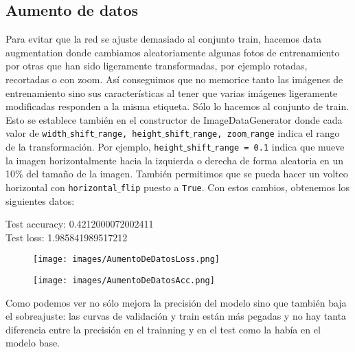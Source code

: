 \documentclass[12pt]{article}
\begin{document}
\subsection*{Aumento de datos}
Para evitar que la red se ajuste demasiado al conjunto train, hacemos data augmentation donde cambiamos aleatoriamente algunas fotos de entrenamiento por otras que han sido ligeramente transformadas, por ejemplo rotadas, recortadas o con zoom. Así conseguimos que no memorice tanto las imágenes de entrenamiento sino sus características al tener que varias imágenes ligeramente modificadas responden a la misma etiqueta. Sólo lo hacemos al conjunto de train. Esto se establece también en el constructor de ImageDataGenerator donde cada valor de \texttt{width$\_$shift$\_$range, height$\_$shift$\_$range, zoom$\_$range} indica el rango de la transformación. Por ejemplo, \texttt{height$\_$shift$\_$range = 0.1} indica que mueve la imagen horizontalmente hacia la izquierda o derecha de forma aleatoria en un 10$\%$ del tamaño de la imagen. También permitimos que se pueda hacer un volteo horizontal con \texttt{horizontal$\_$flip} puesto a \texttt{True}. Con estos cambios, obtenemos los siguientes datos:
\\
\begin{center}
Test accuracy: 0.4212000072002411\\
Test loss: 1.985841989517212
\end{center}
\begin{figure}[H]
\centering
\parbox{8cm}{
\texttt{[image: images/AumentoDeDatosLoss.png]}
\caption{}
\label{fig:2figsA}}
\begin{minipage}{8cm}
\texttt{[image: images/AumentoDeDatosAcc.png]}
\caption{}
\label{fig:2figsB}
\end{minipage}
\end{figure}
Como podemos ver no sólo mejora la precisión del modelo sino que también baja el sobreajuste: las curvas de validación y train están más pegadas y no hay tanta diferencia entre la precisión en el trainning y en el test como la había en el modelo base.
\end{document}
